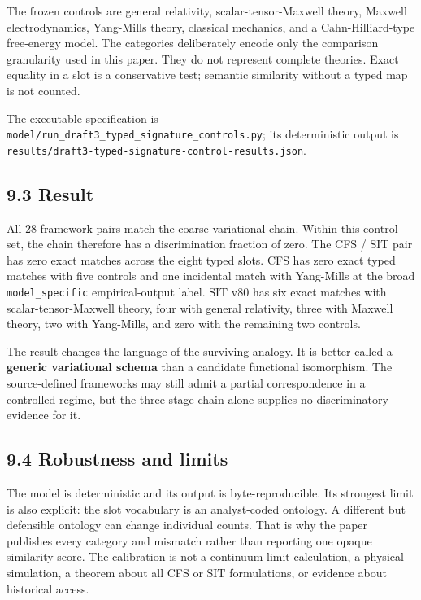 \documentclass[
  american,
  11pt,
  letterpaper,
]{article}
\begin{document}
The frozen controls are general relativity, scalar-tensor-Maxwell theory, Maxwell electrodynamics, Yang-Mills theory, classical mechanics, and a Cahn-Hilliard-type free-energy model. The categories deliberately encode only the comparison granularity used in this paper. They do not represent complete theories. Exact equality in a slot is a conservative test; semantic similarity without a typed map is not counted.

The executable specification is \nolinkurl{model/run_draft3_typed_signature_controls.py}; its deterministic output is \nolinkurl{results/draft3-typed-signature-control-results.json}.

\subsection{9.3 Result}\label{result}

All 28 framework pairs match the coarse variational chain. Within this control set, the chain therefore has a discrimination fraction of zero. The CFS / SIT pair has zero exact matches across the eight typed slots. CFS has zero exact typed matches with five controls and one incidental match with Yang-Mills at the broad \texttt{model\_specific} empirical-output label. SIT v80 has six exact matches with scalar-tensor-Maxwell theory, four with general relativity, three with Maxwell theory, two with Yang-Mills, and zero with the remaining two controls.

The result changes the language of the surviving analogy. It is better called a \textbf{generic variational schema} than a candidate functional isomorphism. The source-defined frameworks may still admit a partial correspondence in a controlled regime, but the three-stage chain alone supplies no discriminatory evidence for it.

\subsection{9.4 Robustness and limits}\label{robustness-and-limits}

The model is deterministic and its output is byte-reproducible. Its strongest limit is also explicit: the slot vocabulary is an analyst-coded ontology. A different but defensible ontology can change individual counts. That is why the paper publishes every category and mismatch rather than reporting one opaque similarity score. The calibration is not a continuum-limit calculation, a physical simulation, a theorem about all CFS or SIT formulations, or evidence about historical access.
\end{document}
